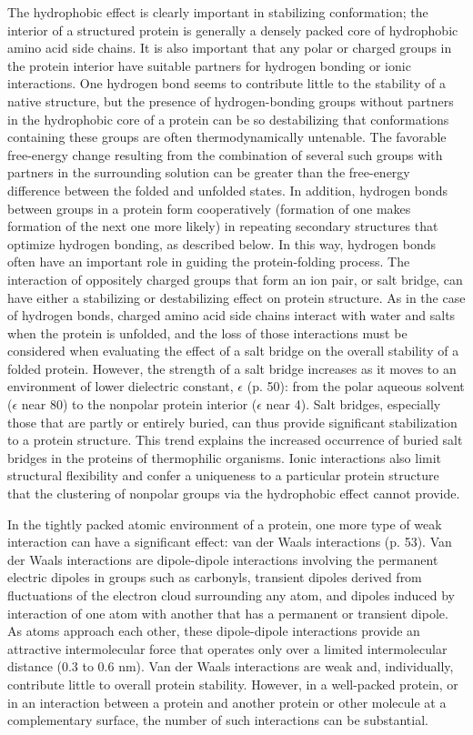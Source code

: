 The hydrophobic effect is clearly important in stabilizing conformation; the interior of a structured protein is generally a densely packed core of hydrophobic amino acid side chains. It is also important that any polar or charged groups in the protein interior have suitable partners for hydrogen bonding or ionic interactions. One hydrogen bond seems to contribute little to the stability of a native structure, but the presence of hydrogen-bonding groups without partners in the hydrophobic core of a protein can be so destabilizing that conformations containing these groups are often thermodynamically untenable. The favorable free-energy change resulting from the combination of several such groups with partners in the surrounding solution can be greater than the free-energy difference between the folded and unfolded states. In addition, hydrogen bonds between groups in a protein form cooperatively (formation of one makes formation of the next one more likely) in repeating secondary structures that optimize hydrogen bonding, as described below. In this way, hydrogen bonds often have an important role in guiding the protein-folding process. The interaction of oppositely charged groups that form an ion pair, or salt bridge, can have either a stabilizing or destabilizing effect on protein structure. As in the case of hydrogen bonds, charged amino acid side chains interact with water and salts when the protein is unfolded, and the loss of those interactions must be considered when evaluating the effect of a salt bridge on the overall stability of a folded protein. However, the strength of a salt bridge increases as it moves to an environment of lower dielectric constant, $\epsilon$ (p. 50): from the polar aqueous solvent ($\epsilon$ near 80) to the nonpolar protein interior ($\epsilon$ near 4). Salt bridges, especially those that are partly or entirely buried, can thus provide significant stabilization to a protein structure. This trend explains the increased occurrence of buried salt bridges in the proteins of thermophilic organisms. Ionic interactions also limit structural flexibility and confer a uniqueness to a particular protein structure that the clustering of nonpolar groups via the hydrophobic effect cannot provide. 

In the tightly packed atomic environment of a protein, one more type of weak interaction can have a significant effect: van der Waals interactions (p. 53). Van der Waals interactions are dipole-dipole interactions involving the permanent electric dipoles in groups such as carbonyls, transient dipoles derived from fluctuations of the electron cloud surrounding any atom, and dipoles induced by interaction of one atom with another that has a permanent or transient dipole. As atoms approach each other, these dipole-dipole interactions provide an attractive intermolecular force that operates only over a limited intermolecular distance (0.3 to 0.6 nm). Van der Waals interactions are weak and, individually, contribute little to overall protein stability. However, in a well-packed protein, or in an interaction between a protein and another protein or other molecule at a complementary surface, the number of such interactions can be substantial. 

